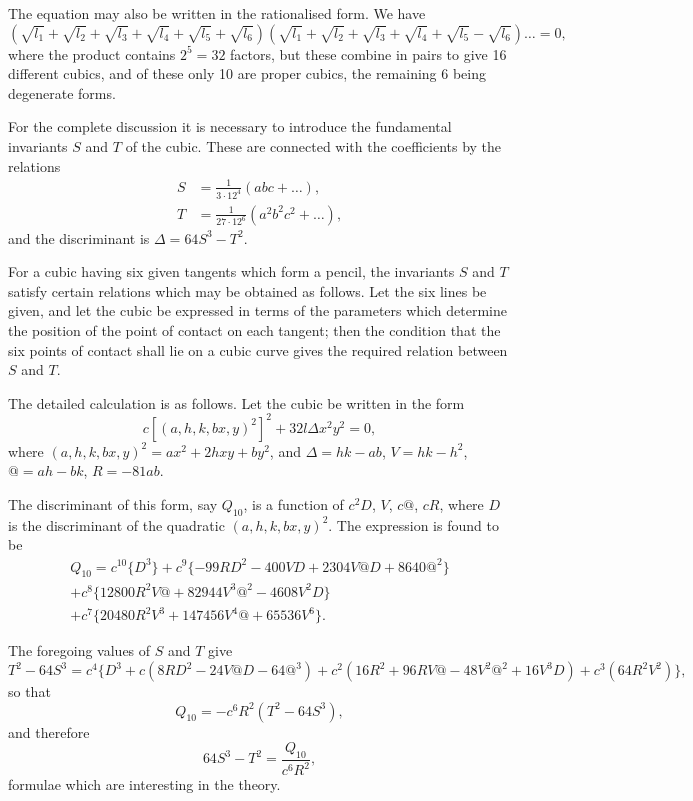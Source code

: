 \documentclass[11pt,a4paper]{article}
\theoremstyle{definition}
\begin{document}
The equation may also be written in the rationalised form. We have
\[
(\sqrt{l_1} + \sqrt{l_2} + \sqrt{l_3} + \sqrt{l_4} + \sqrt{l_5} + \sqrt{l_6})(\sqrt{l_1} + \sqrt{l_2} + \sqrt{l_3} + \sqrt{l_4} + \sqrt{l_5} - \sqrt{l_6}) \dots = 0,
\]
where the product contains $2^5 = 32$ factors, but these combine in pairs to give 16 different cubics, and of these only 10 are proper cubics, the remaining 6 being degenerate forms.

For the complete discussion it is necessary to introduce the fundamental invariants $S$ and $T$ of the cubic. These are connected with the coefficients by the relations
\begin{align*}
S &= \frac{1}{3\cdot 12^4}(abc + \dots),\\
T &= \frac{1}{27\cdot 12^6}(a^2b^2c^2 + \dots),
\end{align*}
and the discriminant is $\Delta = 64S^3 - T^2$.

For a cubic having six given tangents which form a pencil, the invariants $S$ and $T$ satisfy certain relations which may be obtained as follows. Let the six lines be given, and let the cubic be expressed in terms of the parameters which determine the position of the point of contact on each tangent; then the condition that the six points of contact shall lie on a cubic curve gives the required relation between $S$ and $T$.

\newpage

The detailed calculation is as follows. Let the cubic be written in the form
\[
c[(a,h,k,b x,y)^2]^2 + 32l\Delta x^2y^2 = 0,
\]
where $(a,h,k,b x,y)^2 = ax^2 + 2hxy + by^2$, and $\Delta = hk - ab$, $V = hk - h^2$, $@ = ah - bk$, $R = -81ab$.

The discriminant of this form, say $Q_{10}$, is a function of $c^2D$, $V$, $c\text{@}$, $cR$, where $D$ is the discriminant of the quadratic $(a,h,k,b x,y)^2$. The expression is found to be
\begin{multline*}
Q_{10} = c^{10}\{D^3\} + c^9\{-99RD^2 - 400VD + 2304V\text{@}D + 8640\text{@}^2\} \\
+ c^8\{12800R^2V\text{@} + 82944V^3\text{@}^2 - 4608V^2D\} \\
+ c^7\{20480R^2V^3 + 147456V^4\text{@} + 65536V^6\}.
\end{multline*}

The foregoing values of $S$ and $T$ give
\[
T^2 - 64S^3 = c^4\{D^3 + c(8RD^2 - 24V\text{@}D - 64\text{@}^3) + c^2(16R^2 + 96RV\text{@} - 48V^2\text{@}^2 + 16V^3D) + c^3(64R^2V^2)\},
\]
so that
\[
Q_{10} = -c^6R^2(T^2 - 64S^3),
\]
and therefore
\[
64S^3 - T^2 = \frac{Q_{10}}{c^6R^2},
\]
formulae which are interesting in the theory.
\end{document}
